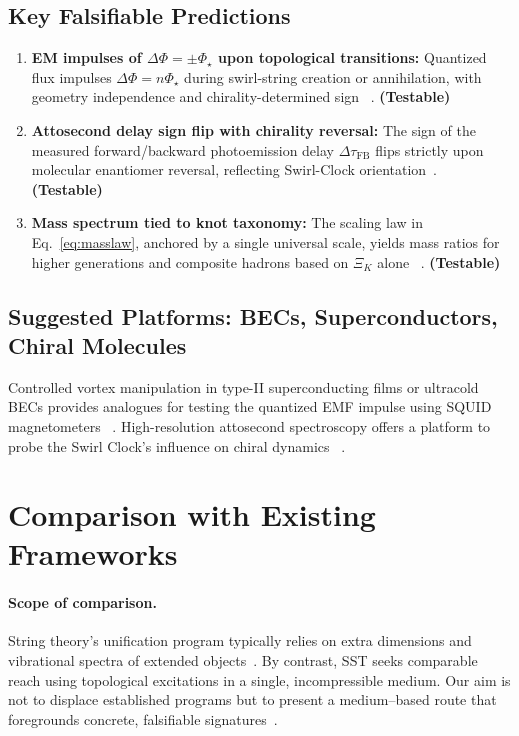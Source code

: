 \documentclass[10pt,reprint,aps,onecolumn,nofootinbib]{revtex4-2}
\newcommand{\testable}{\textbf{(Testable)}}
\begin{document}
    \subsection*{Key Falsifiable Predictions}
        \begin{enumerate}
            \item \textbf{EM impulses of $\Delta\Phi = \pm \Phi_\star$ upon topological transitions:} Quantized flux impulses $\Delta\Phi=n\Phi_\star$ during swirl-string creation or annihilation, with geometry independence and chirality-determined sign~ \cite{EM_G}. \testable
            \item \textbf{Attosecond delay sign flip with chirality reversal:} The sign of the measured forward/backward photoemission delay $\Delta\tau_\text{FB}$ flips strictly upon molecular enantiomer reversal, reflecting Swirl-Clock orientation~\cite{sstAttosecondPhotoionization,Nahon2020}. \testable
            \item \textbf{Mass spectrum tied to knot taxonomy:} The scaling law in Eq.~\ref{eq:masslaw}, anchored by a single universal scale, yields mass ratios for higher generations and composite hadrons based on $\Xi_K$ alone~ \cite{sstLagrangian}. \testable
        \end{enumerate}

    \subsection*{Suggested Platforms: BECs, Superconductors, Chiral Molecules}
        Controlled vortex manipulation in type-II superconducting films or ultracold BECs provides analogues for testing the quantized EMF impulse using SQUID magnetometers~ \cite{EM_G}. High-resolution attosecond spectroscopy offers a platform to probe the Swirl Clock’s influence on chiral dynamics~ \cite{sstAttosecondPhotoionization}.

\section{Comparison with Existing Frameworks}
\label{sec:comparison}

    \paragraph*{Scope of comparison.}
        String theory’s unification program typically relies on extra dimensions and vibrational spectra of extended objects~\cite{Susskind2003}. By contrast, SST seeks comparable reach using topological excitations in a single, incompressible medium. Our aim is not to displace established programs but to present a medium–based route that foregrounds concrete, falsifiable signatures~\cite{Hossenfelder2018}.
\end{document}
